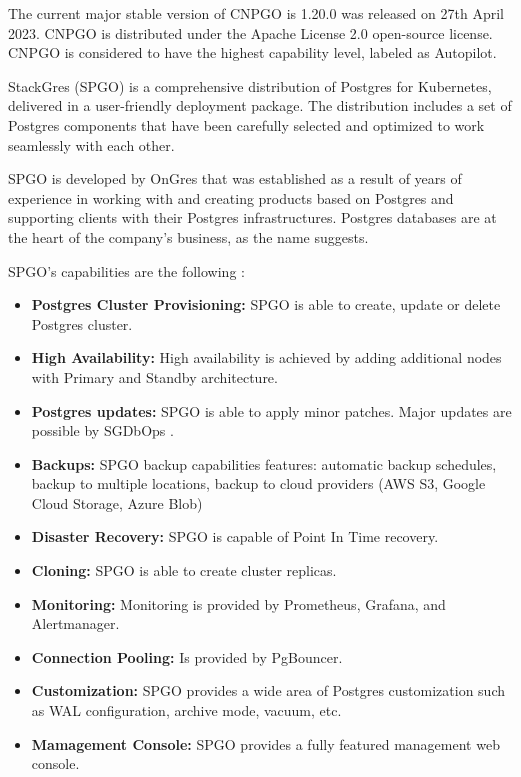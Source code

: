 
The current major stable version of CNPGO is 1.20.0 was released on 27th April 2023. \cite{CNPGreleases} CNPGO is distributed under the Apache License 2.0 open-source license. CNPGO is considered to have the highest capability level, labeled as Autopilot. \cite{CNPGdocu}

StackGres (SPGO) is a comprehensive distribution of Postgres for Kubernetes, delivered in a user-friendly deployment package. The distribution includes a set of Postgres components that have been carefully selected and optimized to work seamlessly with each other. \cite{SPGOgitlab}

SPGO is developed by OnGres that was established as a result of years of experience in working with and creating products based on Postgres and supporting clients with their Postgres infrastructures. Postgres databases are at the heart of the company's business, as the name suggests. \cite{OnGres}

SPGO’s capabilities are the following \cite{OnGres}:
\begin{itemize}
  \item \textbf{Postgres Cluster Provisioning:} SPGO is able to create, update or delete Postgres cluster.
  \item \textbf{High Availability:} High availability is achieved by adding additional nodes with Primary and Standby architecture.
  \item \textbf{Postgres updates:} SPGO is able to apply minor patches. Major updates are possible by SGDbOps \cite{SPGODocuMajorUpdates}.
  \item \textbf{Backups:} SPGO backup capabilities features: automatic backup schedules, backup to multiple locations, backup to cloud providers (AWS S3, Google Cloud Storage, Azure Blob)
  \item \textbf{Disaster Recovery:} SPGO is capable of Point In Time recovery.
  \item \textbf{Cloning:} SPGO is able to create cluster replicas.
  \item \textbf{Monitoring:} Monitoring is provided by Prometheus, Grafana, and Alertmanager.
  \item \textbf{Connection Pooling:} Is provided by PgBouncer.
  \item \textbf{Customization:} SPGO provides a wide area of Postgres customization such as WAL configuration, archive mode, vacuum, etc. \cite{SPGODocuCustomization}
  \item \textbf{Mamagement Console:} SPGO provides a fully featured management web console.

\end{itemize}

